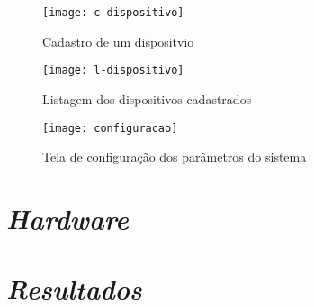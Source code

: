 \begin{figure}[h!]
	\texttt{[image: c-dispositivo]}
	\centering
	\caption[Cadastro de um dispositivo]{Cadastro de um dispositvio}
	\label{fig:c-dispositivo} 
\end{figure}
\FloatBarrier

\begin{figure}[h!]
	\texttt{[image: l-dispositivo]}
	\centering
	\caption[Listagem dos dispositivos cadastrados]{Listagem dos dispositivos cadastrados}
	\label{fig:l-dispositivo} 
\end{figure}
\FloatBarrier

\begin{figure}[h!]
	\texttt{[image: configuracao]}
	\centering
	\caption[Tela de configuração dos parâmetros do sistema]{Tela de configuração dos parâmetros do sistema}
	\label{fig:configuracao-ft} 
\end{figure}
\FloatBarrier

\section[\textit{Hardware}]{\textit{Hardware}}\label{hard-sec}
\section[\textit{Resultados}]{\textit{Resultados}}\label{resultados-sec}
